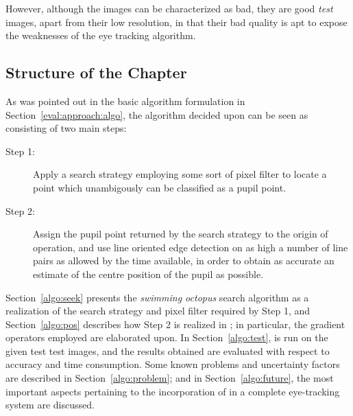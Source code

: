 However, although the images can be characterized as bad, they are
good {\em test\/} images, apart from their low resolution, in that
their bad quality is apt to expose the weaknesses of the eye tracking
algorithm.

\subsection{Structure of the Chapter}
\label{algot:intro:structure}

As was pointed out in the basic algorithm formulation in
Section~\ref{eval:approach:algo}, the algorithm decided upon can be
seen as consisting of two main steps: 
\begin{description}
\item[Step 1:] Apply a search strategy employing some sort of pixel
  filter to locate a point which unambigously can be classified as a
  pupil point.
\item[Step 2:] Assign the pupil point returned by the search strategy
  to the origin of operation, and use line oriented edge detection on
  as high a number of line pairs as allowed by the time available, in
  order to obtain as accurate an estimate of the centre position of
  the pupil as possible.
\end{description}

Section~\ref{algo:seek} presents the {\em swimming octopus\/} search
algorithm as a realization of the search strategy and pixel filter
required by Step 1, and Section~\ref{algo:pos} describes how Step 2 is
realized in {\octopus}; in particular, the gradient operators employed
are elaborated upon.  In Section~\ref{algo:test}, {\octopus} is run on
the given test test images, and the results obtained are evaluated
with respect to accuracy and time consumption.  Some known problems
and uncertainty factors are described in Section~\ref{algo:problem};
and in Section~\ref{algo:future}, the most important aspects
pertaining to the incorporation of {\octopus} in a complete
eye-tracking system are discussed.
